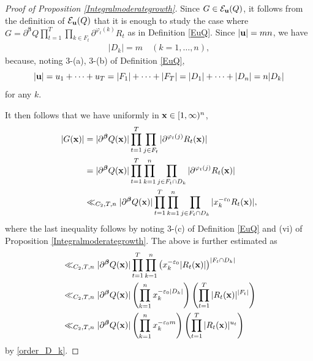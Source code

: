 \documentclass[a4paper,12pt]{article}
\theoremstyle{definition}
\numberwithin{equation}{section}
\def\x{{\bf x}}
\def\u{{\bf u}}
\newcommand{\betab}{\boldsymbol{\beta}}
\def\eps{{\varepsilon}}
\begin{document}
\begin{proof}[Proof of Proposition \ref{Integralmoderategrowth}]
Since $G\in \mathcal E_{\u}(Q)$, it follows from the definition of $\mathcal E_{\u}(Q)$ that it is enough to study the case where
$G= \partial^{\betab} Q \prod_{t=1}^T \prod_{k\in F_t} \partial^{\varphi_t(k)}R_t$ as in Definition \ref{EuQ}. 
Since $|\u|= m n$, we have 
\begin{align}\label{order_D_k}
|D_k|=m \quad(k=1,\ldots,n),
\end{align}
because, noting 3-(a), 3-(b) of Definition \ref{EuQ},
$$
|\u|=u_1+\cdots+u_T=|F_1|+\cdots+|F_T|
=|D_1|+\cdots+|D_n|=n|D_k|
$$
for any $k$.

It then follows that we have uniformly in $\x\in  [1,\infty)^n$,
\begin{align*}
|G(\x)|&= |\partial^{\betab} Q(\x)| \prod_{t=1}^T \prod_{j\in F_t} |\partial^{\varphi_t(j)}R_t(\x)|\\
&= |\partial^{\betab} Q (\x)| \prod_{t=1}^T\prod_{k=1}^n \prod_{j\in F_t\cap D_k} |\partial^{\varphi_t(j)}R_t(\x)|\\
&\ll_{C_2, T, n} |\partial^{\betab} Q (\x)| \prod_{t=1}^T\prod_{k=1}^n \prod_{j\in F_t\cap D_k}|x_k^{-\eps_0} R_t(\x)|,
\end{align*}
where the last inequality follows by noting 
3-(c) of Definition \ref{EuQ} and (vi) of Proposition
\ref{Integralmoderategrowth}.
The above is further estimated as
\begin{align}\label{ggggg}
&\ll_{C_2, T, n} |\partial^{\betab} Q (\x)| \prod_{t=1}^T\prod_{k=1}^n \left(x_k^{-\eps_0} |R_t(\x)|\right)^{|F_t\cap D_k|}\nonumber\\
&\ll_{C_2, T, n} |\partial^{\betab} Q (\x)| \left(\prod_{k=1}^n x_k^{-\eps_0 |D_k|}\right) \left(\prod_{t=1}^T |R_t(\x)|^{|F_t|}\right)\nonumber\\
&\ll_{C_2, T, n} |\partial^{\betab} Q (\x)| \left(\prod_{k=1}^n x_k^{-\eps_0 m}\right) \left(\prod_{t=1}^T |R_t(\x)|^{u_t}\right)
\end{align}
by \eqref{order_D_k}.


\end{proof}
\end{document}
